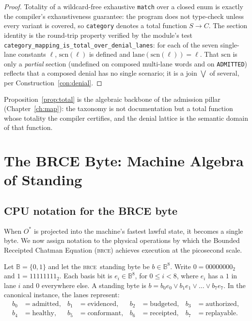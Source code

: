 \documentclass[11pt,oneside]{book}
\theoremstyle{definition}
\theoremstyle{plain}
\theoremstyle{remark}
\newcommand{\BRCE}{\textsc{brce}}
\newcommand{\code}[1]{\texttt{#1}}
\begin{document}
\begin{proof}
Totality of a wildcard-free exhaustive \code{match} over a closed enum is exactly the
compiler's exhaustiveness guarantee: the program does not type-check unless every variant is
covered, so \code{category} denotes a total function $S\to C$. The section identity is the
round-trip property verified by the module's test
\code{category\_mapping\_is\_total\_over\_denial\_lanes}: for each of the seven single-lane
constants $\ell$, $\text{scn}(\ell)$ is defined and $\text{lane}(\text{scn}(\ell))=\ell$.
That $\text{scn}$ is only a \emph{partial} section (undefined on composed multi-lane words
and on \code{ADMITTED}) reflects that a composed denial has no single scenario; it is a
join $\bigvee$ of several, per Construction~\ref{con:denial}. \end{proof}

Proposition~\ref{prop:total} is the algebraic backbone of the admission pillar
(Chapter~\ref{ch:map}): the taxonomy is not documentation but a total function whose
totality the compiler certifies, and the denial lattice is the semantic domain of that
function.

\chapter{The BRCE Byte: Machine Algebra of Standing}
\label{ch:brce_byte}

\section{CPU notation for the BRCE byte}

When $O^*$ is projected into the machine's fastest lawful state, it becomes a single byte. We now assign notation to the physical operations by which the Bounded Receipted Chatman Equation (\BRCE) achieves execution at the picosecond scale.

Let $\mathbb{B} = \{0, 1\}$ and let the \BRCE\ standing byte be $b \in \mathbb{B}^8$. Write $0 = 00000000_2$ and $1 = 11111111_2$. Each basis bit is $e_i \in \mathbb{B}^8$, for $0 \le i < 8$, where $e_i$ has a $1$ in lane $i$ and $0$ everywhere else. A standing byte is $b = b_0e_0 \vee b_1e_1 \vee \dots \vee b_7e_7$. In the canonical instance, the lanes represent:
\begin{align*}
b_0 &= \text{admitted}, & b_1 &= \text{evidenced}, & b_2 &= \text{budgeted}, & b_3 &= \text{authorized},\\
b_4 &= \text{healthy}, & b_5 &= \text{conformant}, & b_6 &= \text{receipted}, & b_7 &= \text{replayable}.
\end{align*}
\end{document}
